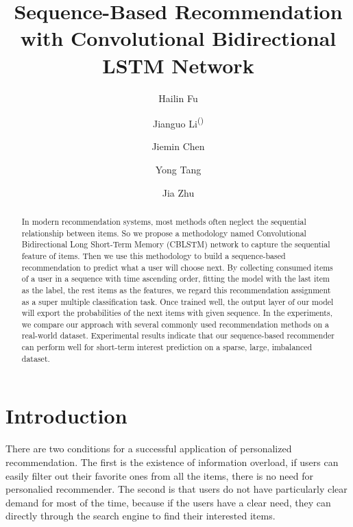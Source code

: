 \documentclass[runningheads]{llncs}
\begin{document}
%
\title{Sequence-Based Recommendation with Convolutional Bidirectional LSTM Network}
%
%
\author{Hailin Fu \and Jianguo Li\textsuperscript{(\Letter)} \and Jiemin Chen \and Yong Tang \and Jia Zhu}
%
%
%
\maketitle              %
%
\begin{abstract}
In modern recommendation systems, most methods often neglect the sequential relationship between items. So we propose a methodology named Convolutional Bidirectional Long Short-Term Memory (CBLSTM) network to capture the sequential feature of items. Then we use this methodology to build a sequence-based recommendation to predict what a user will choose next. By collecting consumed items of a user in a sequence with time ascending order, fitting the model with the last item as the label, the rest items as the features, we regard this recommendation assignment as a super multiple classification task. Once trained well, the output layer of our model will export the probabilities of the next items with given sequence. In the experiments, we compare our approach with several commonly used recommendation methods on a real-world dataset. Experimental results indicate that our sequence-based recommender can perform well for short-term interest prediction on a sparse, large, imbalanced dataset.

\end{abstract}
% 
%
%
\section{Introduction}

There are two conditions for a successful application of personalized recommendation.
The first is the existence of information overload, if users can easily filter out their favorite ones from all the items, there is no need for personalied recommender. The second is that users do not have particularly clear demand for most of the time, because if the users have a clear need, they can directly through the search engine to find their interested items. 
\end{document}
